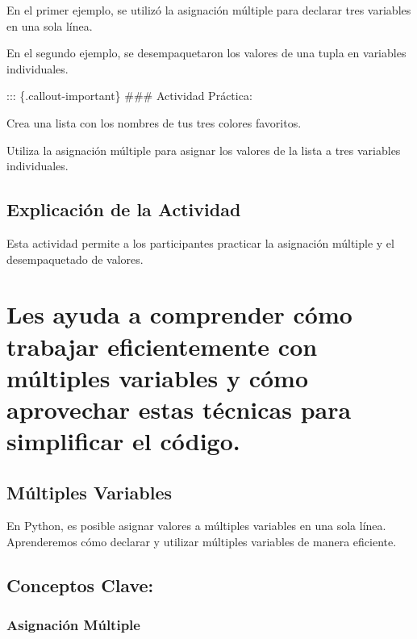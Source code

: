 \documentclass[
  a4paper,
  DIV=11,
  numbers=noendperiod,
  onepage,
  openany]{scrreprt}
\begin{document}
En el primer ejemplo, se utilizó la asignación múltiple para declarar
tres variables en una sola línea.

En el segundo ejemplo, se desempaquetaron los valores de una tupla en
variables individuales.

::: \{.callout-important\} \#\#\# Actividad Práctica:

Crea una lista con los nombres de tus tres colores favoritos.

Utiliza la asignación múltiple para asignar los valores de la lista a
tres variables individuales.

\hypertarget{explicaciuxf3n-de-la-actividad-10}{%
\section{Explicación de la
Actividad}\label{explicaciuxf3n-de-la-actividad-10}}

Esta actividad permite a los participantes practicar la asignación
múltiple y el desempaquetado de valores.

\hypertarget{les-ayuda-a-comprender-cuxf3mo-trabajar-eficientemente-con-muxfaltiples-variables-y-cuxf3mo-aprovechar-estas-tuxe9cnicas-para-simplificar-el-cuxf3digo.}{%
\chapter{Les ayuda a comprender cómo trabajar eficientemente con
múltiples variables y cómo aprovechar estas técnicas para simplificar el
código.}\label{les-ayuda-a-comprender-cuxf3mo-trabajar-eficientemente-con-muxfaltiples-variables-y-cuxf3mo-aprovechar-estas-tuxe9cnicas-para-simplificar-el-cuxf3digo.}}

\hypertarget{muxfaltiples-variables-1}{%
\section{Múltiples Variables}\label{muxfaltiples-variables-1}}

En Python, es posible asignar valores a múltiples variables en una sola
línea. Aprenderemos cómo declarar y utilizar múltiples variables de
manera eficiente.

\hypertarget{conceptos-clave-13}{%
\section{Conceptos Clave:}\label{conceptos-clave-13}}

\hypertarget{asignaciuxf3n-muxfaltiple-1}{%
\subsection{Asignación Múltiple}\label{asignaciuxf3n-muxfaltiple-1}}
\end{document}
